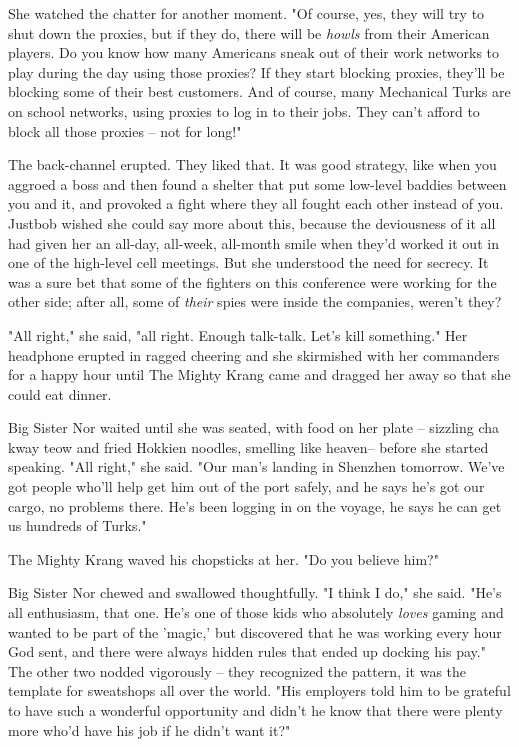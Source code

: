 She watched the chatter for another moment. "Of course, yes, they
will try to shut down the proxies, but if they do, there will be
\emph{howls} from their American players. Do you know how many
Americans sneak out of their work networks to play during the day
using those proxies? If they start blocking proxies, they'll be
blocking some of their best customers. And of course, many
Mechanical Turks are on school networks, using proxies to log in to
their jobs. They can't afford to block all those proxies -- not for
long!"

The back-channel erupted. They liked that. It was good strategy,
like when you aggroed a boss and then found a shelter that put some
low-level baddies between you and it, and provoked a fight where
they all fought each other instead of you. Justbob wished she could
say more about this, because the deviousness of it all had given
her an all-day, all-week, all-month smile when they'd worked it out
in one of the high-level cell meetings. But she understood the need
for secrecy. It was a sure bet that some of the fighters on this
conference were working for the other side; after all, some of
\emph{their} spies were inside the companies, weren't they?

"All right," she said, "all right. Enough talk-talk. Let's kill
something." Her headphone erupted in ragged cheering and she
skirmished with her commanders for a happy hour until The Mighty
Krang came and dragged her away so that she could eat dinner.

Big Sister Nor waited until she was seated, with food on her plate
-- sizzling cha kway teow and fried Hokkien noodles, smelling like
heaven-- before she started speaking. "All right," she said. "Our
man's landing in Shenzhen tomorrow. We've got people who'll help
get him out of the port safely, and he says he's got our cargo, no
problems there. He's been logging in on the voyage, he says he can
get us hundreds of Turks."

The Mighty Krang waved his chopsticks at her. "Do you believe
him?"

Big Sister Nor chewed and swallowed thoughtfully. "I think I do,"
she said. "He's all enthusiasm, that one. He's one of those kids
who absolutely \emph{loves} gaming and wanted to be part of the
'magic,' but discovered that he was working every hour God sent,
and there were always hidden rules that ended up docking his pay."
The other two nodded vigorously -- they recognized the pattern, it
was the template for sweatshops all over the world. "His employers
told him to be grateful to have such a wonderful opportunity and
didn't he know that there were plenty more who'd have his job if he
didn't want it?"

